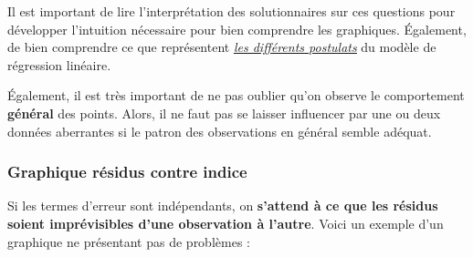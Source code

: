 \documentclass[french]{article}
\begin{document}
\begin{multicols*}{2}
\begin{rappel_enhanced}[Contexte]
\bigskip

Il est important de lire l'interprétation des solutionnaires sur ces questions pour développer l'intuition nécessaire pour bien comprendre les graphiques. Également, de bien comprendre ce que représentent \textit{\color{bleudefrance}\underline{\hyperlink{postulatsSLR}{\color{bleudefrance} les différents postulats}}} du modèle de régression linéaire.

\bigskip

Également, il est très important de ne pas oublier qu'on observe le comportement \textbf{général}  des points. Alors, il ne faut pas se laisser influencer par une ou deux données aberrantes si le patron des observations en général semble adéquat.
\end{rappel_enhanced}


\subsubsection{Graphique résidus contre indice}
Si les termes d'erreur sont indépendants, on \textbf{s'attend à ce que les résidus soient imprévisibles d'une observation à l'autre}. Voici un exemple d'un graphique ne présentant pas de problèmes : 
\begin{center}
\begin{tikzpicture}[x=0.75pt,y=0.75pt,yscale=-1,xscale=1]


\end{tikzpicture}
\end{center}
\end{multicols*}
\end{document}
